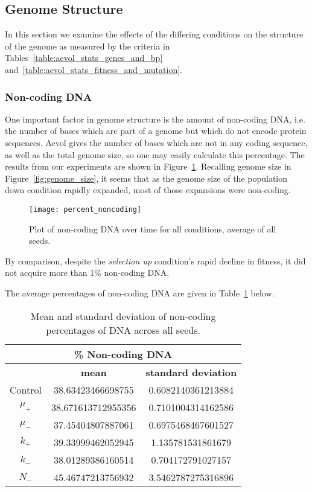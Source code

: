 \subsection{Genome Structure}
In this section we examine the effects of the differing conditions on the structure of the genome as measured by the criteria in Tables~\ref{table:aevol_stats_genes_and_bp} and~\ref{table:aevol_stats_fitness_and_mutation}. 

\subsubsection{Non-coding DNA}
One important factor in genome structure is the amount of non-coding DNA, i.e. the number of bases which are part of a genome but which do not encode protein sequences. Aevol gives the number of bases which are not in any coding sequence, as well as the total genome size, so one may easily calculate this percentage. The results from our experiments are shown in Figure~\ref{fig:mean_non-coding_DNA}. Recalling genome size in Figure~\ref{fig:genome_size}, it seems that as the genome size of the population down condition rapidly expanded, most of those expansions were non-coding.
\begin{figure}[H]
	\centering
	\texttt{[image: percent\_noncoding]}
	\caption[Non-coding DNA]{Plot of non-coding DNA over time for all conditions, average of all seeds.}
	\label{fig:mean_non-coding_DNA}
\end{figure}
By comparison, despite the \textit{selection up} condition's rapid decline in fitness, it did not acquire more than 1\% non-coding DNA. 

The average percentages of non-coding DNA are given in Table~\ref{table:non-coding_DNA_mean_and_standard_deviation} below. 
\begin{table}[H]
	\begin{tabular}{|c|c|c|}
		\hline
		\multicolumn{3}{c}{\Large \textbf{\% Non-coding DNA}} \\
		\hline
		& \textbf{mean} & \textbf{standard deviation} \\
		\hline \hline
		Control & 38.63423466698755	& 0.6082140361213884 \\
		\hline
		$\mu_+$ & 38.671613712955356 & 0.7101004314162586 \\
		\hline
		$\mu_-$ & 37.45404807887061 & 0.6975468467601527 \\
		\hline
		$k_+$ & 39.33999462052945 & 1.135781531861679 \\
		\hline
		$k_-$ & 38.01289386160514 & 0.704172791027157 \\
		\hline
		$N_-$ & 45.46747213756932 & 3.5462787275316896 \\
		\hline
	\end{tabular}
	\caption[Non-coding DNA mean and standard deviation]{Mean and standard deviation of non-coding percentages of DNA across all seeds.}
	\label{table:non-coding_DNA_mean_and_standard_deviation}
\end{table}

